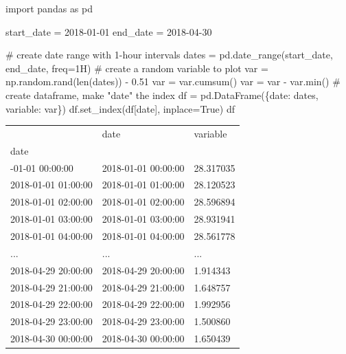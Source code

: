 \documentclass[
  letterpaper,
  DIV=11,
  numbers=noendperiod,
  oneside]{scrreprt}
\newenvironment{Shaded}{\begin{snugshade}}{\end{snugshade}}
\newcommand{\BuiltInTok}[1]{\textcolor[rgb]{0.00,0.23,0.31}{#1}}
\newcommand{\CommentTok}[1]{\textcolor[rgb]{0.37,0.37,0.37}{#1}}
\newcommand{\FloatTok}[1]{\textcolor[rgb]{0.68,0.00,0.00}{#1}}
\newcommand{\ImportTok}[1]{\textcolor[rgb]{0.00,0.46,0.62}{#1}}
\newcommand{\NormalTok}[1]{\textcolor[rgb]{0.00,0.23,0.31}{#1}}
\newcommand{\OperatorTok}[1]{\textcolor[rgb]{0.37,0.37,0.37}{#1}}
\newcommand{\StringTok}[1]{\textcolor[rgb]{0.13,0.47,0.30}{#1}}
\newcommand{\VariableTok}[1]{\textcolor[rgb]{0.07,0.07,0.07}{#1}}
\begin{document}
\begin{Shaded}
\begin{Highlighting}[]
\ImportTok{import}\NormalTok{ pandas }\ImportTok{as}\NormalTok{ pd}

\NormalTok{start\_date }\OperatorTok{=} \StringTok{\textquotesingle{}2018{-}01{-}01\textquotesingle{}}
\NormalTok{end\_date }\OperatorTok{=} \StringTok{\textquotesingle{}2018{-}04{-}30\textquotesingle{}}

\CommentTok{\# create date range with 1{-}hour intervals}
\NormalTok{dates }\OperatorTok{=}\NormalTok{ pd.date\_range(start\_date, end\_date, freq}\OperatorTok{=}\StringTok{\textquotesingle{}1H\textquotesingle{}}\NormalTok{)}
\CommentTok{\# create a random variable to plot}
\NormalTok{var }\OperatorTok{=}\NormalTok{ np.random.rand(}\BuiltInTok{len}\NormalTok{(dates)) }\OperatorTok{{-}} \FloatTok{0.51}
\NormalTok{var }\OperatorTok{=}\NormalTok{ var.cumsum()}
\NormalTok{var }\OperatorTok{=}\NormalTok{ var }\OperatorTok{{-}}\NormalTok{ var.}\BuiltInTok{min}\NormalTok{()}
\CommentTok{\# create dataframe, make "date" the index}
\NormalTok{df }\OperatorTok{=}\NormalTok{ pd.DataFrame(\{}\StringTok{\textquotesingle{}date\textquotesingle{}}\NormalTok{: dates, }\StringTok{\textquotesingle{}variable\textquotesingle{}}\NormalTok{: var\})}
\NormalTok{df.set\_index(df[}\StringTok{\textquotesingle{}date\textquotesingle{}}\NormalTok{], inplace}\OperatorTok{=}\VariableTok{True}\NormalTok{)}
\NormalTok{df}
\end{Highlighting}
\end{Shaded}

\begin{longtable}[]{@{}lll@{}}
\toprule\noalign{}
& date & variable \\
date & & \\
\midrule\noalign{}
\endhead
\bottomrule\noalign{}
\endlastfoot
2018-01-01 00:00:00 & 2018-01-01 00:00:00 & 28.317035 \\
2018-01-01 01:00:00 & 2018-01-01 01:00:00 & 28.120523 \\
2018-01-01 02:00:00 & 2018-01-01 02:00:00 & 28.596894 \\
2018-01-01 03:00:00 & 2018-01-01 03:00:00 & 28.931941 \\
2018-01-01 04:00:00 & 2018-01-01 04:00:00 & 28.561778 \\
... & ... & ... \\
2018-04-29 20:00:00 & 2018-04-29 20:00:00 & 1.914343 \\
2018-04-29 21:00:00 & 2018-04-29 21:00:00 & 1.648757 \\
2018-04-29 22:00:00 & 2018-04-29 22:00:00 & 1.992956 \\
2018-04-29 23:00:00 & 2018-04-29 23:00:00 & 1.500860 \\
2018-04-30 00:00:00 & 2018-04-30 00:00:00 & 1.650439 \\
\end{longtable}
\end{document}
